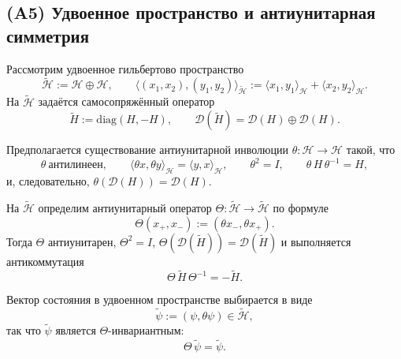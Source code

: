 \documentclass{article}
\numberwithin{equation}{section}
\theoremstyle{plain}
\theoremstyle{definition}
\theoremstyle{remark}
\def\theta{θ}\def\Theta{Θ}\def\pi{π}\def\Pi{Π}%
\begin{document}
\subsection{(A5) Удвоенное пространство и антиунитарная симметрия}

\noindent
Рассмотрим удвоенное гильбертово пространство
\begin{equation}
\widetilde{\mathcal H}:=\mathcal H\oplus\mathcal H,
\qquad
\langle (x_1,x_2),(y_1,y_2)\rangle_{\widetilde{\mathcal H}}
:=\langle x_1,y_1\rangle_{\mathcal H}+\langle x_2,y_2\rangle_{\mathcal H}.
\end{equation}
На $\widetilde{\mathcal H}$ задаётся самосопряжённый оператор
\begin{equation}
\widetilde H:=\mathrm{diag}(H,-H),
\qquad
\mathcal D(\widetilde H)=\mathcal D(H)\oplus\mathcal D(H).
\end{equation}

\medskip
\noindent
Предполагается существование антиунитарной инволюции $\theta:\mathcal H\to\mathcal H$ такой, что
\begin{equation}
\theta\ \text{антилинеен},\qquad
\langle \theta x,\theta y\rangle_{\mathcal H}=\langle y,x\rangle_{\mathcal H},
\qquad
\theta^2=I,
\qquad
\theta\,H\,\theta^{-1}=H,
\label{eq:QSSC-theta-H}
\end{equation}
и, следовательно, $\theta(\mathcal D(H))=\mathcal D(H)$.

На $\widetilde{\mathcal H}$ определим антиунитарный оператор $\Theta:\widetilde{\mathcal H}\to\widetilde{\mathcal H}$ по формуле
\begin{equation}
\Theta(x_+,x_-):=(\theta x_-,\theta x_+).
\label{eq:QSSC-Theta-def}
\end{equation}
Тогда $\Theta$ антиунитарен, $\Theta^2=I$, $\Theta(\mathcal D(\widetilde H))=\mathcal D(\widetilde H)$ и выполняется антикоммутация
\begin{equation}
\Theta\,\widetilde H\,\Theta^{-1}=-\widetilde H.
\label{eq:QSSC-Theta-H}
\end{equation}

\medskip
\noindent
Вектор состояния в удвоенном пространстве выбирается в виде
\begin{equation}
\widetilde\psi:=(\psi,\theta\psi)\in\widetilde{\mathcal H},
\label{eq:QSSC0011}
\end{equation}
так что $\widetilde\psi$ является $\Theta$-инвариантным:
\begin{equation}
\Theta\,\widetilde\psi=\widetilde\psi.
\label{eq:QSSC-Theta-psi}
\end{equation}
\end{document}
